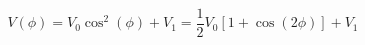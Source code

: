 \begin{equation}
\label{eq:Photodiode_Voltage}
V(\phi) = V_{0} \cos^2(\phi)+ V_{1} = \frac{1}{2}V_0\left[1 + \cos(2 \phi)\right]+ V_1
\end{equation}